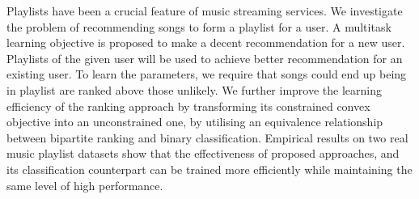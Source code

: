 Playlists have been a crucial feature of music streaming services.
We investigate the problem of recommending songs to form a playlist for a user.
A multitask learning objective is proposed to make a decent recommendation for a new user.
Playlists of the given user will be used to achieve better recommendation for an existing user.
To learn the parameters, we require that songs could end up being in playlist are ranked above those unlikely.
We further improve the learning efficiency of the ranking approach by transforming its
constrained convex objective into an unconstrained one,
by utilising an equivalence relationship between bipartite ranking and binary classification.
Empirical results on two real music playlist datasets show that the effectiveness of proposed approaches,
and its classification counterpart can be trained more efficiently while maintaining the same level of high performance.
